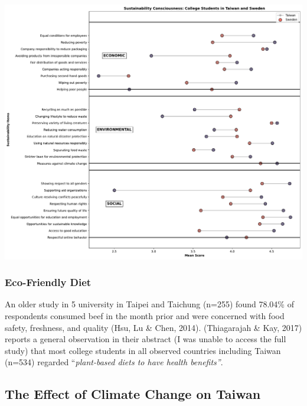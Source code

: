 \documentclass[
  letterpaper,
  DIV=11,
  numbers=noendperiod]{scrartcl}
\begin{document}
\includegraphics{_thesis_files/figure-pdf/cell-7-output-1.pdf}

\subsubsection{Eco-Friendly Diet}\label{eco-friendly-diet}

An older study in 5 university in Taipei and Taichung (n=255) found
78.04\% of respondents consumed beef in the month prior and were
concerned with food safety, freshness, and quality (Hsu, Lu \& Chen,
2014). (Thiagarajah \& Kay, 2017) reports a general observation in their
abstract (I was unable to access the full study) that most college
students in all observed countries including Taiwan (n=534) regarded
``\emph{plant-based diets to have health benefits''}.

\subsection{The Effect of Climate Change on
Taiwan}\label{the-effect-of-climate-change-on-taiwan}
\end{document}
